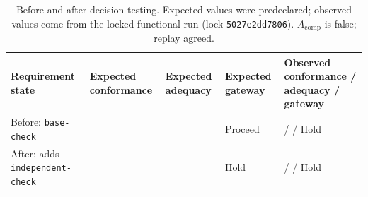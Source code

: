 \begin{table}[pos=t]
\centering\small
\caption{Before-and-after decision testing. Expected values were predeclared; observed values come from the locked functional run (lock \texttt{5027e2dd7806}). $A_{\mathrm{comp}}$ is false; replay agreed.}
\label{tab:functional-results}
\label{tab:functional-protocol}
\begin{tabularx}{\textwidth}{@{}L{.31\textwidth}L{.13\textwidth}L{.13\textwidth}L{.13\textwidth}Y@{}}
\toprule
Requirement state & Expected conformance & Expected adequacy & Expected gateway & Observed conformance / adequacy / gateway \\
\midrule
Before: \texttt{base-check} & \Pass{} & \Pass{} & Proceed & \Pass{} / \Fail{} / Hold \\
After: adds \texttt{independent-check} & \Pass{} & \Fail{} & Hold & \Pass{} / \Fail{} / Hold \\
\bottomrule
\end{tabularx}
\end{table}
